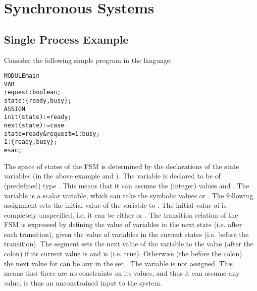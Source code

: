 \section{Synchronous Systems}
\label{Synchronous Systems}

\subsection{Single Process Example}
\label{Mutual Exclusion Example}

Consider the following simple program in the \nusmv language:
\noindent
\begin{alltt}
MODULE main
VAR
  request : boolean;
  state   : \{ready, busy\};
ASSIGN
  init(state) := ready;
  next(state) := case
                   state = ready & request = 1 : busy;
                   1                        : \{ready, busy\};
                 esac;
\end{alltt}

The space of states of the
FSM is determined by the declarations of the state
variables (in the above example  and ). The
variable  is declared to be of (predefined) type
.  This means that it can assume the (integer) values
 and . The variable  is a scalar variable,
which can take the symbolic values  or .
The following assignment sets the initial value of the variable
 to . The initial value of  is
completely unspecified, i.e. it can be either  or .
The transition relation of the FSM is expressed by defining
the value of variables in the next state (i.e. after each transition),
given the value of variables in the current states (i.e. before the
transition). The  segment sets the next value of the variable
 to the value  (after the colon) if its current
value is  and  is  (i.e. true).
Otherwise (the  before the colon) the next value for
 can be any in the set .
The variable  is not assigned. This means that there are
no constraints on its values, and thus it can assume any value.
 is thus an unconstrained input to the system.



